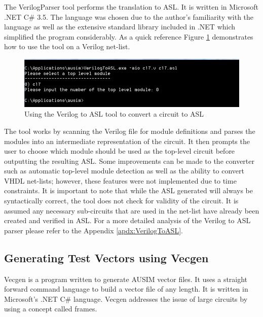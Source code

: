 \documentclass[12pt]{report}
\begin{document}
The VerilogParser tool performs the translation to ASL.  It is written in Microsoft .NET C\# 3.5.  The language was chosen due to the author's familiarity with the language as well as the extensive standard library included in .NET which simplified the program considerably\cite{csharp}.  As a quick reference Figure \ref{fig:VerilogParserUse} demonstrates how to use the tool on a Verilog net-list.
\begin{figure}
	\begin{center}
		\includegraphics[scale=.9]{images/verilog-asl-command}
	\end{center}
	\caption{Using the Verilog to ASL tool to convert a circuit to ASL}
	\label{fig:VerilogParserUse}
\end{figure}
The tool works by scanning the Verilog file for module definitions and parses the modules into an intermediate representation of the circuit.  It then prompts the user to choose which module should be used as the top-level circuit before outputting the resulting ASL.  Some improvements can be made to the converter such as automatic top-level module detection as well as the ability to convert VHDL net-lists; however, these features were not implemented due to time constraints.  It is important to note that while the ASL generated will always be syntactically correct, the tool does not check for validity of the circuit.  It is assumed any necessary sub-circuits that are used in the net-list have already been created and verified in ASL.  For a more detailed analysis of the Verilog to ASL parser please refer to the Appendix \ref{apdx:VerilogToASL}.  

\subsection{Generating Test Vectors using Vecgen}
Vecgen is a program written to generate AUSIM vector files.  It uses a straight forward command language to build a vector file of any length.  It is written in Microsoft's .NET C\#\cite{csharp} language. Vecgen addresses the issue of large circuits by using a concept called frames.  
\end{document}
